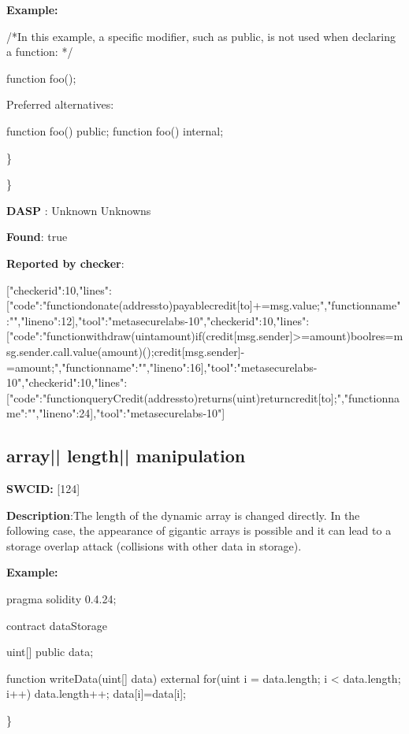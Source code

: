 \documentclass{article}
\begin{document}
\textbf{Example:} 
\begin{ffcode} 

/*In this example, a specific modifier, such as public, is not used when declaring a function: */ 

function foo();

Preferred alternatives:

function foo() public;
function foo() internal;

\end{ffcode} 
\} 

\} 

\textbf{DASP} : Unknown Unknowns

\textbf{Found}: true

\textbf{Reported by checker}: 
\begin{ffcode} 

[{"checker\textunderscore id":10,"lines":[{"code":"functiondonate(addressto)payable{credit[to]+=msg.value;}","function\textunderscore name":"","line\textunderscore no":12}],"tool":"metasecurelabs-10"},{"checker\textunderscore id":10,"lines":[{"code":"functionwithdraw(uintamount){if(credit[msg.sender]>=amount){boolres=msg.sender.call.value(amount)();credit[msg.sender]-=amount;}}","function\textunderscore name":"","line\textunderscore no":16}],"tool":"metasecurelabs-10"},{"checker\textunderscore id":10,"lines":[{"code":"functionqueryCredit(addressto)returns(uint){returncredit[to];}","function\textunderscore name":"","line\textunderscore no":24}],"tool":"metasecurelabs-10"}]
\end{ffcode} 
\subsection{array{|\textunderscore| }length{|\textunderscore| }manipulation} 
\textbf{SWC{\textunderscore }ID:} [124]

\textbf{Description}:The length of the dynamic array is changed directly. In the following case, the appearance of gigantic arrays is possible and it can lead to a storage overlap attack (collisions with other data in storage).


\textbf{Example:} 
\begin{ffcode} 

pragma solidity 0.4.24;

contract dataStorage {
    uint[] public data;

    function writeData(uint[] \textunderscore data) external {
        for(uint i = data.length; i < \textunderscore data.length; i++) {
            data.length++;
            data[i]=\textunderscore data[i];
        }
    }
}

\end{ffcode} 
\} 
\end{document}
